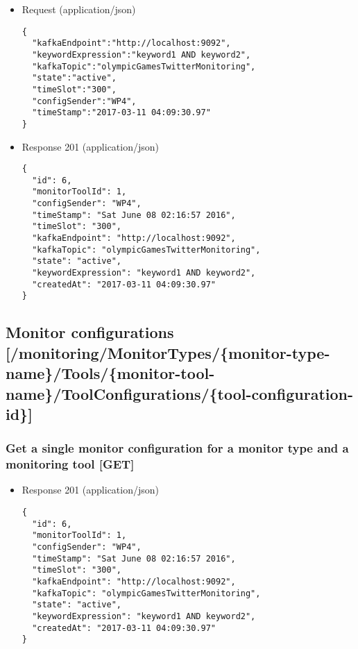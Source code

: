 \begin{itemize}
\item
  Request (application/json)

\begin{verbatim}
{
  "kafkaEndpoint":"http://localhost:9092",
  "keywordExpression":"keyword1 AND keyword2",
  "kafkaTopic":"olympicGamesTwitterMonitoring",
  "state":"active",
  "timeSlot":"300",
  "configSender":"WP4",
  "timeStamp":"2017-03-11 04:09:30.97"
}
\end{verbatim}
\item
  Response 201 (application/json)

\begin{verbatim}
{
  "id": 6,
  "monitorToolId": 1,
  "configSender": "WP4",
  "timeStamp": "Sat June 08 02:16:57 2016",
  "timeSlot": "300",
  "kafkaEndpoint": "http://localhost:9092",
  "kafkaTopic": "olympicGamesTwitterMonitoring",
  "state": "active",
  "keywordExpression": "keyword1 AND keyword2",
  "createdAt": "2017-03-11 04:09:30.97"
}
\end{verbatim}
\end{itemize}

\subsection{Monitor configurations
{[}/monitoring/MonitorTypes/\{monitor-type-name\}/Tools/\{monitor-tool-name\}/ToolConfigurations/\{tool-configuration-id\}{]}}\label{monitor-configurations-monitoringmonitortypesmonitor-type-nametoolsmonitor-tool-nametoolconfigurationstool-configuration-id}

\subsubsection{Get a single monitor configuration for a monitor type and
a monitoring tool
{[}GET{]}}\label{get-a-single-monitor-configuration-for-a-monitor-type-and-a-monitoring-tool-get}

\begin{itemize}
\item
  Response 201 (application/json)

\begin{verbatim}
{
  "id": 6,
  "monitorToolId": 1,
  "configSender": "WP4",
  "timeStamp": "Sat June 08 02:16:57 2016",
  "timeSlot": "300",
  "kafkaEndpoint": "http://localhost:9092",
  "kafkaTopic": "olympicGamesTwitterMonitoring",
  "state": "active",
  "keywordExpression": "keyword1 AND keyword2",
  "createdAt": "2017-03-11 04:09:30.97"
}
\end{verbatim}
\end{itemize}

